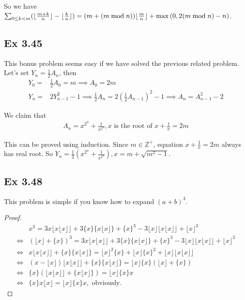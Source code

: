\documentclass{article}
\begin{document}
So we have$\sum_{0\le k < m}(\lfloor \frac{m+k}{n} \rfloor - \lfloor \frac{k}{n} \rfloor) = (m + (m \bmod n))\lfloor \frac{m}{n} \rfloor + \max{(0, 2(m \bmod n)-n)}$.

\subsection{Ex 3.45}
This bonus problem seems easy if we have solved the previous related problem. Let's set $Y_n=\frac{1}{2}A_n$, then
\begin{equation}
    \begin{split}
        Y_0 = & \frac{1}{2}A_0 = m \implies A_0 = 2m\\
        Y_n = & 2Y_{n-1}^2 - 1 \implies \frac{1}{2}A_n = 2(\frac{1}{2}A_{n-1})^2 - 1 \implies A_n = A_{n-1}^2 - 2
    \end{split}
\end{equation}

We claim that
\begin{equation}
    \begin{split}
        A_n = x^{2^n} + \frac{1}{x^{2^n}}, x \text{ is the root of } x + \frac{1}{x} = 2m
    \end{split}
\end{equation}

This can be proved using induction. Since $m\in \mathbb{Z}^+$, equation $x+\frac{1}{x}=2m$ always has real root. So $Y_n=\frac{1}{2}(x^{2^n} + \frac{1}{x^{2^n}}), x = m+\sqrt{m^2-1}$.

\subsection{Ex 3.48}

This problem is simple if you know how to expand $(a+b)^3$.
\begin{proof}
    \begin{equation}
        \begin{split}
            & x^3 = 3x \lfloor x \lfloor x \rfloor  \rfloor + 3\{x\}\{x\lfloor x \rfloor\} + \{x\}^3 - 3\lfloor x \rfloor \lfloor x \lfloor x \rfloor \rfloor + \lfloor x \rfloor ^ 3\\
       \iff & (\lfloor x \rfloor + \{x\})^3 =  3x \lfloor x \lfloor x \rfloor  \rfloor + 3\{x\}\{x\lfloor x \rfloor\} + \{x\}^3 - 3\lfloor x \rfloor \lfloor x \lfloor x \rfloor \rfloor + \lfloor x \rfloor ^ 3\\    
       \iff & x\lfloor x \lfloor x \rfloor \rfloor + \{x\}\{x \lfloor x \rfloor \} = \lfloor x \rfloor ^2 \{x\} + \lfloor x \rfloor \{x\}^2 + \lfloor x \rfloor \lfloor x \lfloor x \rfloor \rfloor\\
       \iff & (x - \lfloor x \rfloor)\lfloor x \lfloor x \rfloor \rfloor + \{x\}\{x\lfloor x \rfloor\} = \lfloor x \rfloor \{ x \}(\lfloor x \rfloor + \{ x \})\\
       \iff & \{ x \}(\lfloor x \lfloor x \rfloor \rfloor + \{x \lfloor x \rfloor\}) = \lfloor x \rfloor \{ x \} x \\
       \iff & \{x\} x \lfloor x \rfloor = \lfloor x \rfloor\{ x \}x, \text{  obviously.}
        \end{split}
    \end{equation}
\end{proof}
\end{document}
